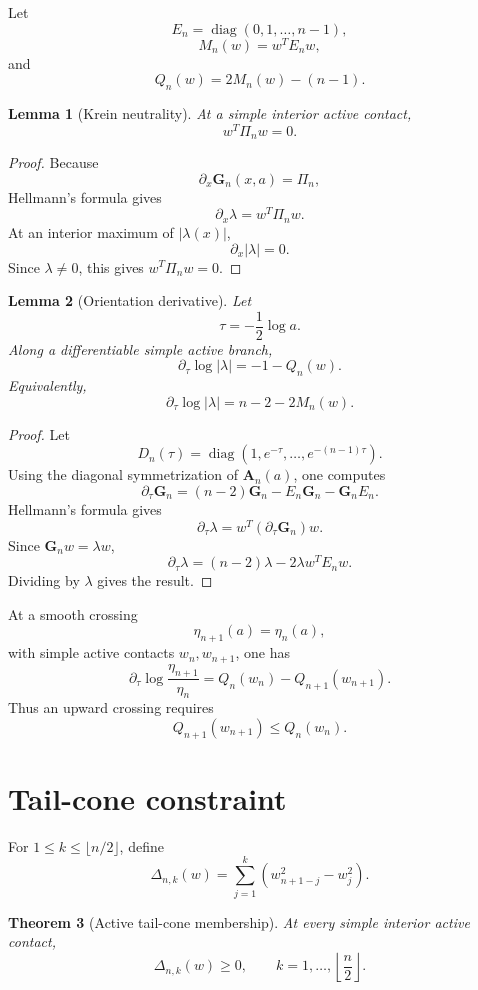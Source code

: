 \documentclass[11pt]{article}
\numberwithin{equation}{section}
\newtheorem{theorem}{Theorem}[section]
\newtheorem{lemma}[theorem]{Lemma}
\begin{document}
Let
\[
E_n=\operatorname{diag}(0,1,\dots,n-1),
\]
\[
M_n(w)=w^TE_nw,
\]
and
\[
Q_n(w)=2M_n(w)-(n-1).
\]

\begin{lemma}[Krein neutrality]
\label{lem:neutrality}
At a simple interior active contact,
\[
w^T\Pi_nw=0.
\]
\end{lemma}

\begin{proof}
Because
\[
\partial_x\mathbf G_n(x,a)=\Pi_n,
\]
Hellmann's formula gives
\[
\partial_x\lambda=w^T\Pi_nw.
\]
At an interior maximum of \(|\lambda(x)|\),
\[
\partial_x|\lambda|=0.
\]
Since \(\lambda\ne0\), this gives \(w^T\Pi_nw=0\).
\end{proof}

\begin{lemma}[Orientation derivative]
\label{lem:orientation-derivative}
Let
\[
\tau=-\frac12\log a.
\]
Along a differentiable simple active branch,
\[
\partial_\tau\log|\lambda|
=
-1-Q_n(w).
\]
Equivalently,
\[
\partial_\tau\log|\lambda|
=
n-2-2M_n(w).
\]
\end{lemma}

\begin{proof}
Let
\[
D_n(\tau)=\operatorname{diag}(1,e^{-\tau},\dots,e^{-(n-1)\tau}).
\]
Using the diagonal symmetrization of \(\mathbf A_n(a)\), one computes
\[
\partial_\tau \mathbf G_n
=
(n-2)\mathbf G_n-E_n\mathbf G_n-\mathbf G_nE_n.
\]
Hellmann's formula gives
\[
\partial_\tau\lambda
=
w^T(\partial_\tau\mathbf G_n)w.
\]
Since \(\mathbf G_nw=\lambda w\),
\[
\partial_\tau\lambda
=
(n-2)\lambda-2\lambda w^TE_nw.
\]
Dividing by \(\lambda\) gives the result.
\end{proof}

At a smooth crossing
\[
\eta_{n+1}(a)=\eta_n(a),
\]
with simple active contacts \(w_n,w_{n+1}\), one has
\[
\partial_\tau\log\frac{\eta_{n+1}}{\eta_n}
=
Q_n(w_n)-Q_{n+1}(w_{n+1}).
\]
Thus an upward crossing requires
\[
Q_{n+1}(w_{n+1})\le Q_n(w_n).
\]

\section{Tail-cone constraint}

For \(1\le k\le\lfloor n/2\rfloor\), define
\[
\Delta_{n,k}(w)
=
\sum_{j=1}^{k}\left(w_{n+1-j}^2-w_j^2\right).
\]

\begin{theorem}[Active tail-cone membership]
\label{thm:tail-cone}
At every simple interior active contact,
\[
\Delta_{n,k}(w)\ge0,
\qquad
k=1,\dots,\left\lfloor\frac n2\right\rfloor.
\]
\end{theorem}
\end{document}
